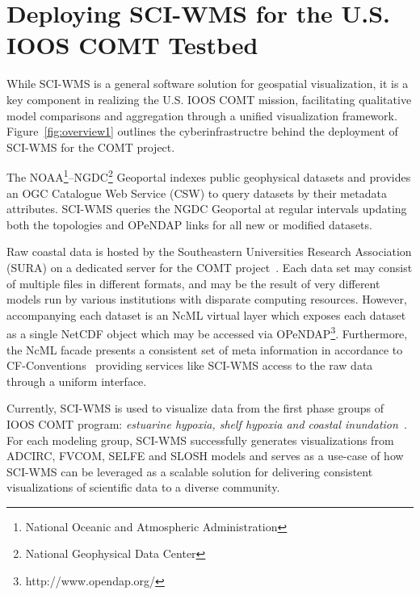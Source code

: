 \documentclass[11pt,twocolumn,twoside]{IEEEtran}
\newcommand{\comt}{COMT}
\newcommand{\ioos}{IOOS}
\newcommand{\sura}{SURA}
\newcommand{\ogc}{OGC}
\newcommand{\csw}{CSW}
\newcommand{\ncml}{NcML}
\newcommand{\noaa}{NOAA}
\newcommand{\ngdc}{NGDC}
\newcommand{\opendap}{OPeNDAP}
\newcommand{\netcdf}{NetCDF}
\newcommand{\sciwms}{SCI-WMS}
\newcommand{\Sciwms}{SCI-WMS}
\newcommand{\adcirc}{ADCIRC}
\newcommand{\fvcom}{FVCOM}
\newcommand{\selfe}{SELFE}
\newcommand{\slosh}{SLOSH}
\begin{document}
\section{Deploying \sciwms{} for the U.S. \ioos{} \comt{} Testbed}
While \sciwms{} is a general software solution for geospatial
visualization, it is a key component in realizing the U.S. \ioos{}
\comt{} mission, facilitating qualitative model comparisons and
aggregation through a unified visualization
framework. Figure~\ref{fig:overview1} outlines the cyberinfrastructre
behind the deployment of \sciwms{} for the \comt{} project.

The \noaa{}\footnote{National Oceanic and Atmospheric
  Administration}--\ngdc{}\footnote{National Geophysical Data Center}
Geoportal indexes public geophysical datasets and provides an \ogc{}
Catalogue Web Service (\csw{}) to query datasets by their metadata
attributes. \sciwms{} queries the \ngdc{} Geoportal at regular intervals
updating both the topologies and \opendap{} links for all new or
modified datasets.

Raw coastal data is hosted by the Southeastern Universities Research
Association (\sura{}) on a dedicated server for the \comt{}
project~\cite{luettich12}. Each data set may consist of multiple files
in different formats, and may be the result of very different models
run by various institutions with disparate computing
resources. However, accompanying each dataset is an \ncml{} virtual
layer which exposes each dataset as a single \netcdf{} object which
may be accessed via
\opendap{}\footnote{http://www.opendap.org/}. Furthermore, the \ncml{}
facade presents a consistent set of meta information in accordance to
CF-Conventions~\cite{cf} providing services like \sciwms{} access to
the raw data through a uniform interface.

Currently, \Sciwms{} is used to visualize data from the first phase
groups of \ioos{} \comt{} program: {\em estuarine hypoxia, shelf hypoxia and
  coastal inundation}~\cite{luettich13}. For each modeling group,
\sciwms{} successfully generates visualizations from \adcirc{},
\fvcom{}, \selfe{} and \slosh{} models and serves as a use-case of how
\sciwms{} can be leveraged as a scalable solution for delivering
consistent visualizations of scientific data to a diverse community.
\end{document}
